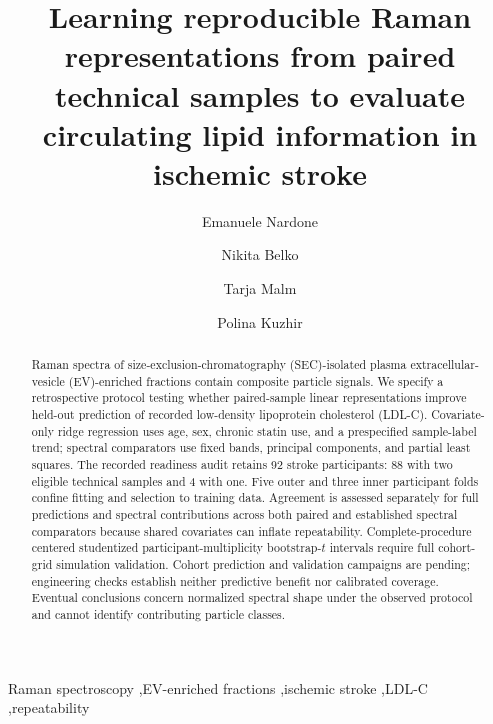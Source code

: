 \documentclass[preprint,12pt]{elsarticle}
\begin{document}
\linenumbers

\begin{frontmatter}

\title{Learning reproducible Raman representations from paired technical samples to evaluate circulating lipid information in ischemic stroke}

\author[1]{Emanuele Nardone}
\author[1]{Nikita Belko}
\author[2]{Tarja Malm}
\author[1]{Polina Kuzhir}


\begin{abstract}
Raman spectra of size-exclusion-chromatography (SEC)-isolated plasma extracellular-vesicle (EV)-enriched fractions contain composite particle signals. We specify a retrospective protocol testing whether paired-sample linear representations improve held-out prediction of recorded low-density lipoprotein cholesterol (LDL-C). Covariate-only ridge regression uses age, sex, chronic statin use, and a prespecified sample-label trend; spectral comparators use fixed bands, principal components, and partial least squares. The recorded readiness audit retains 92 stroke participants: 88 with two eligible technical samples and 4 with one. Five outer and three inner participant folds confine fitting and selection to training data. Agreement is assessed separately for full predictions and spectral contributions across both paired and established spectral comparators because shared covariates can inflate repeatability. Complete-procedure centered studentized participant-multiplicity bootstrap-$t$ intervals require full cohort-grid simulation validation. Cohort prediction and validation campaigns are pending; engineering checks establish neither predictive benefit nor calibrated coverage. Eventual conclusions concern normalized spectral shape under the observed protocol and cannot identify contributing particle classes.
\end{abstract}

\begin{keyword}
Raman spectroscopy \sep EV-enriched fractions \sep ischemic stroke \sep LDL-C \sep repeatability
\end{keyword}

\end{frontmatter}
\end{document}
